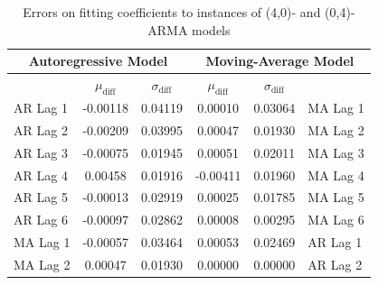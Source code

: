 \documentclass[oneside,12pt,openany]{book}
\begin{document}
    \begin{table}[!ht]
        \centering
        \begin{tabular}{|l|c|c|c|c|l|}
            \hline
            \multicolumn{3}{|c|}{Autoregressive Model} & \multicolumn{3}{c|}{Moving-Average Model} \\ \hline
            \cellcolor{black} & $\mu_{\text{diff}}$ & $\sigma_{\text{diff}}$ & $\mu_{\text{diff}}$ & $\sigma_{\text{diff}}$ &  \cellcolor{black} \\ \hline
            AR Lag 1 & -0.00118 & 0.04119 & 0.00010 & 0.03064 & MA Lag 1 \\ \hline
            AR Lag 2 & -0.00209 & 0.03995 & 0.00047 & 0.01930 & MA Lag 2 \\ \hline
            AR Lag 3 & -0.00075 & 0.01945 & 0.00051 & 0.02011 & MA Lag 3 \\ \hline
            AR Lag 4 & 0.00458 & 0.01916 & -0.00411 & 0.01960 & MA Lag 4 \\ \hline
            AR Lag 5 & -0.00013 & 0.02919 & 0.00025 & 0.01785 & MA Lag 5 \\ \hline
            AR Lag 6 & -0.00097 & 0.02862 & 0.00008 & 0.00295 & MA Lag 6 \\ \hline
            MA Lag 1 & -0.00057 & 0.03464 & 0.00053 & 0.02469 & AR Lag 1 \\ \hline
            MA Lag 2 & 0.00047 & 0.01930 & 0.00000 & 0.00000 & AR Lag 2 \\ \hline
        \end{tabular}
        \caption{Errors on fitting coefficients to instances of (4,0)- and (0,4)-ARMA models}
        \label{tab:errortsfitting4}
    \end{table}
\end{document}
